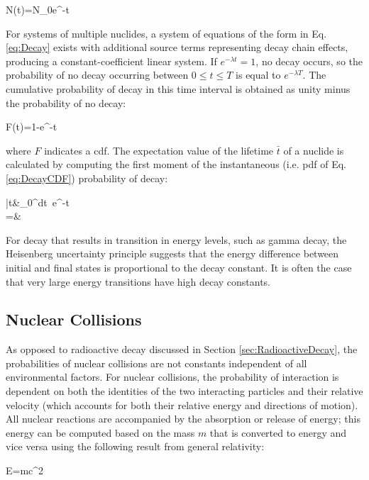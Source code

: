 \beq
\label{eq:DecayEqn}
N(t)=N_0e^{-\lambda t}
\eeq

For systems of multiple nuclides, a system of equations of the form in Eq. \eqref{eq:Decay} exists with additional source terms representing decay chain effects, producing a constant-coefficient linear system. If \(e^{-\lambda t}=1\), no decay occurs, so the probability of no decay occurring between \(0\leq t\leq T\) is equal to \(e^{-\lambda T}\). The cumulative probability of decay in this time interval is obtained as unity minus the probability of no decay:

\beq
\label{eq:DecayCDF}
F(t)=1-e^{-\lambda t}
\eeq

where \(F\) indicates a \gls{cdf}. The expectation value of the lifetime \(\bar{t}\) of a nuclide is calculated by computing the first moment of the instantaneous (i.e. \gls{pdf} of Eq. \eqref{eq:DecayCDF}) probability of decay:

\beqa
\label{eq:MeanLifetime}
\bar{t}\equiv&\int_0^\infty dt\ \lambda e^{-\lambda t}\\
=&
\eeqa

For decay that results in transition in energy levels, such as gamma decay, the Heisenberg uncertainty principle suggests that the energy difference between initial and final states is proportional to the decay constant. It is often the case that very large energy transitions have high decay constants.

\subsection{Nuclear Collisions}
As opposed to radioactive decay discussed in Section \ref{sec:RadioactiveDecay}, the probabilities of nuclear collisions are not constants independent of all environmental factors. For nuclear collisions, the probability of interaction is dependent on both the identities of the two interacting particles and their relative velocity (which accounts for both their relative energy and directions of motion). All nuclear reactions are accompanied by the absorption or release of energy; this energy can be computed based on the mass \(m\) that is converted to energy and vice versa using the following result from general relativity:

\beq
E=mc^2
\eeq


